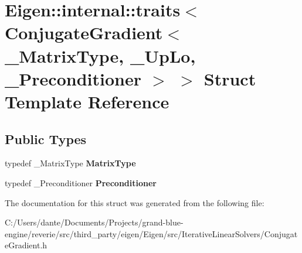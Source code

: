 \hypertarget{struct_eigen_1_1internal_1_1traits_3_01_conjugate_gradient_3_01___matrix_type_00_01___up_lo_00_01___preconditioner_01_4_01_4}{}\section{Eigen\+::internal\+::traits$<$ Conjugate\+Gradient$<$ \+\_\+\+Matrix\+Type, \+\_\+\+Up\+Lo, \+\_\+\+Preconditioner $>$ $>$ Struct Template Reference}
\label{struct_eigen_1_1internal_1_1traits_3_01_conjugate_gradient_3_01___matrix_type_00_01___up_lo_00_01___preconditioner_01_4_01_4}
\subsection*{Public Types}
\begin{DoxyCompactItemize}
\item 
\mbox{\label{struct_eigen_1_1internal_1_1traits_3_01_conjugate_gradient_3_01___matrix_type_00_01___up_lo_00_01___preconditioner_01_4_01_4_aa69c391bfcdba93f1f0ad8012d00c929}} 
typedef \+\_\+\+Matrix\+Type {\bfseries Matrix\+Type}
\item 
\mbox{\label{struct_eigen_1_1internal_1_1traits_3_01_conjugate_gradient_3_01___matrix_type_00_01___up_lo_00_01___preconditioner_01_4_01_4_ab161958cd55f7dde4d0b9b4ff271b214}} 
typedef \+\_\+\+Preconditioner {\bfseries Preconditioner}
\end{DoxyCompactItemize}


The documentation for this struct was generated from the following file\+:\begin{DoxyCompactItemize}
\item 
C\+:/\+Users/dante/\+Documents/\+Projects/grand-\/blue-\/engine/reverie/src/third\+\_\+party/eigen/\+Eigen/src/\+Iterative\+Linear\+Solvers/Conjugate\+Gradient.\+h\end{DoxyCompactItemize}
